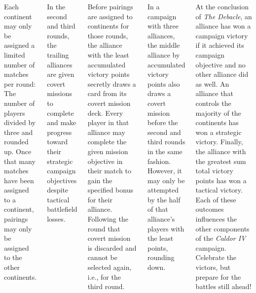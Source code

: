 \begin{columns}
Each continent may only be assigned a limited number of matches per
round: The number of players divided by three and rounded up.  Once
that many matches have been assigned to a continent, pairings may only
be assigned to the other continents.



In the second and third rounds, the trailing alliances are given
covert missions to complete and make progress toward their strategic
campaign objectives despite tactical battlefield losses.

Before pairings are assigned to continents for those rounds, the
alliance with the least accumulated victory points secretly draws a
card from its covert mission deck.  Every player in that alliance may
complete the given mission objective in their match to gain the
specified bonus for their alliance.  Following the round that covert
mission is discarded and cannot be selected again, i.e., for the third
round.

In a campaign with three alliances, the middle alliance by accumulated
victory points also draws a covert mission before the second and third
rounds in the same fashion.  However, it may only be attempted by the
half of that alliance's players with the least points, rounding down.



At the conclusion of \emph{The Debacle}, an alliance has won a
campaign victory if it achieved its campaign objective and no other
alliance did as well.  An alliance that controls the majority of the
continents has won a strategic victory.  Finally, the alliance with
the greatest sum total victory points has won a tactical victory.
Each of these outcomes influences the other components of the
\emph{Caldor IV} campaign.  Celebrate the victors, but prepare for the
battles still ahead!

\end{columns}

\pagebreak
\squelchbackground

